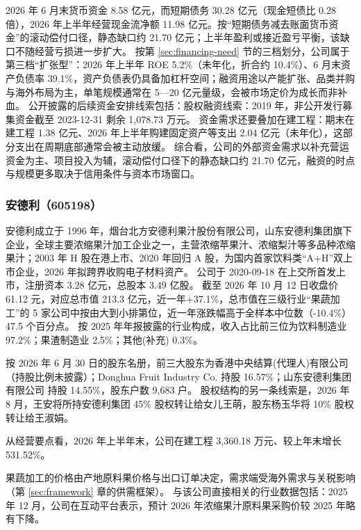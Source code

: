  2026 年 6 月末货币资金 8.58 亿元，而短期债务 30.28 亿元（现金短债比 0.28 倍），2026 年上半年经营现金流净额 11.98 亿元。按“短期债务减去账面货币资金”的滚动偿付口径，静态缺口约 21.70 亿元；上半年盈利或接近盈亏平衡，该缺口不随经营亏损进一步扩大。 按第 \ref{sec:financing-need} 节的三档划分，公司属于第三档“扩张型”：2026 年上半年 ROE 5.2\%（未年化，折合约 10.4\%）、6 月末资产负债率 39.1\%，资产负债表仍具备加杠杆空间；融资用途以产能扩张、品类并购与海外布局为主，单笔规模通常在 5---20 亿元量级，会被市场定价为成长而非补血。 公开披露的后续资金安排线索包括：股权融资线索：2019 年，非公开发行募集资金截至 2023-12-31 剩余 1,078.73 万元。 资金需求还要叠加在建工程：期末在建工程 1.38 亿元、2026 年上半年购建固定资产等支出 2.04 亿元（未年化），这部分支出在周期底部通常会被主动放缓。 综合看，公司的外部资金需求以补充营运资金为主、项目投入为辅，滚动偿付口径下的静态缺口约 21.70 亿元，融资的时点与规模更多取决于信用条件与资本市场窗口。




\subsubsection{安德利（605198）}
\label{co:605198}

 安德利成立于 1996 年，烟台北方安德利果汁股份有限公司，山东安德利集团旗下企业，全球主要浓缩果汁加工企业之一，主营浓缩苹果汁、浓缩梨汁等多品种浓缩果汁；2003 年 H 股在港上市、2020 年回归 A 股，为国内首家饮料类“A+H”双上市企业，2026 年拟跨界收购电子材料资产。 公司于 2020-09-18 在上交所首发上市，注册资本 3.28 亿元，总股本 3.49 亿股。 截至 2026 年 10 月 12 日收盘价 61.12 元，对应总市值 213.3 亿元，近一年+37.1\%，总市值在三级行业“果蔬加工”的 5 家公司中按由大到小排第位，近一年涨跌幅高于全样本中位数（-10.4\%）47.5 个百分点。 按 2025 年年报披露的行业构成，收入占比前三位为饮料制造业 97.2\%；果渣制造业 2.5\%；其他(补充) 0.3\%。

 按 2026 年 6 月 30 日的股东名册，前三大股东为香港中央结算(代理人)有限公司（持股比例未披露）；Donghua Fruit Industry Co. 持股 16.57\%；山东安德利集团有限公司 持股 14.55\%，股东户数 9,683 户。 股权结构的另一条线索是，2026 年 8 月，王安将所持安德利集团 45\% 股权转让给女儿王萌，股东杨玉华将 10\% 股权转让给王淑娟。

 从经营要点看，2026 年上半年末，公司在建工程 3,360.18 万元、较上年末增长 531.52\%。

 果蔬加工的价格由产地原料果价格与出口订单决定，需求端受海外需求与关税影响（第 \ref{sec:framework} 章的供需框架）。 与该公司直接相关的行业数据包括：2025 年 12 月，公司在互动平台表示，预计 2026 年浓缩果汁原料果采购价较 2025 年略有下降。

